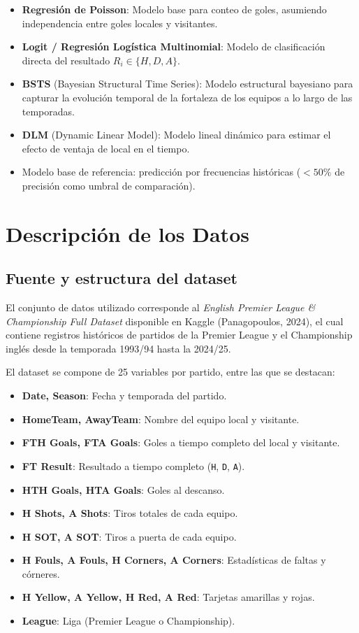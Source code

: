 \documentclass[a4paper,12pt]{article}
\begin{document}
\begin{itemize}
    \item \textbf{Regresión de Poisson}: Modelo base para conteo de goles, asumiendo independencia entre goles locales y visitantes.
    \item \textbf{Logit / Regresión Logística Multinomial}: Modelo de clasificación directa del resultado $R_i \in \{H, D, A\}$.
    \item \textbf{BSTS} (Bayesian Structural Time Series): Modelo estructural bayesiano para capturar la evolución temporal de la fortaleza de los equipos a lo largo de las temporadas.
    \item \textbf{DLM} (Dynamic Linear Model): Modelo lineal dinámico para estimar el efecto de ventaja de local en el tiempo.
    \item Modelo base de referencia: predicción por frecuencias históricas ($< 50\%$ de precisión como umbral de comparación).
\end{itemize}

\section{Descripción de los Datos}

\subsection{Fuente y estructura del dataset}

El conjunto de datos utilizado corresponde al \textit{English Premier League \& Championship Full Dataset} disponible en Kaggle (Panagopoulos, 2024), el cual contiene registros históricos de partidos de la Premier League y el Championship inglés desde la temporada 1993/94 hasta la 2024/25.

El dataset se compone de 25 variables por partido, entre las que se destacan:

\begin{itemize}
    \item \textbf{Date, Season}: Fecha y temporada del partido.
    \item \textbf{HomeTeam, AwayTeam}: Nombre del equipo local y visitante.
    \item \textbf{FTH Goals, FTA Goals}: Goles a tiempo completo del local y visitante.
    \item \textbf{FT Result}: Resultado a tiempo completo (\texttt{H}, \texttt{D}, \texttt{A}).
    \item \textbf{HTH Goals, HTA Goals}: Goles al descanso.
    \item \textbf{H Shots, A Shots}: Tiros totales de cada equipo.
    \item \textbf{H SOT, A SOT}: Tiros a puerta de cada equipo.
    \item \textbf{H Fouls, A Fouls, H Corners, A Corners}: Estadísticas de faltas y córneres.
    \item \textbf{H Yellow, A Yellow, H Red, A Red}: Tarjetas amarillas y rojas.
    \item \textbf{League}: Liga (Premier League o Championship).
\end{itemize}
\end{document}
